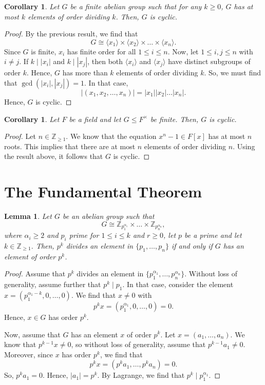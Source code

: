 \documentclass[a4paper, openany]{memoir}
\theoremstyle{definition}
\theoremstyle{plain}
\newtheorem{lemma}[definition]{Lemma}
\newtheorem{corollary}[definition]{Corollary}
\begin{document}
    \begin{corollary}
        Let $G$ be a finite abelian group such that for any $k \geq 0$, $G$ has at most $k$ elements of order dividing $k$. Then, $G$ is cyclic.
    \end{corollary}
    \begin{proof}
        By the previous result, we find that 
        \[G \cong \langle x_1 \rangle \times \langle x_2 \rangle \times \dots \times \langle x_n \rangle.\]
        Since $G$ is finite, $x_i$ has finite order for all $1 \leq i \leq n$. Now, let $1 \leq i, j \leq n$ with $i \neq j$. If $k \mid |x_i|$ and $k \mid |x_j|$, then both $\langle x_i \rangle$ and $\langle x_j \rangle$ have distinct subgroups of order $k$. Hence, $G$ has more than $k$ elements of order dividing $k$. So, we must find that $\gcd(|x_i|, |x_j|) = 1$. In that case,
        \[|(x_1, x_2, \dots, x_n)| = \lvert x_1 \rvert \lvert x_2 \rvert \dots \lvert x_n \rvert.\]
        Hence, $G$ is cyclic.
    \end{proof}

    \begin{corollary}
        Let $F$ be a field and let $G \leq F^\times$ be finite. Then, $G$ is cyclic.
    \end{corollary}
    \begin{proof}
        Let $n \in \mathbb{Z}_{\geq 1}$. We know that the equation $x^n - 1 \in F[x]$ has at most $n$ roots. This implies that there are at most $n$ elements of order dividing $n$. Using the result above, it follows that $G$ is cyclic.
    \end{proof}

    \newpage

    \section{The Fundamental Theorem}
    \begin{lemma}
        Let $G$ be an abelian group such that
        \[G \cong \mathbb{Z}_{p_1^{\alpha_1}} \times \dots \times \mathbb{Z}_{p_n^{\alpha_ n}},\]
        where $\alpha_i \geq 2$ and $p_i$ prime for $1 \leq i \leq k$ and $r \geq 0$, let $p$ be a prime and let $k \in \mathbb{Z}_{\geq 1}$. Then, $p^k$ divides an element in $\{p_1, \dots, p_n\}$ if and only if $G$ has an element of order $p^k$.
    \end{lemma}
    \begin{proof}
        Assume that $p^k$ divides an element in $\{p_1^{\alpha_1}, \dots, p_n^{\alpha_n}\}$. Without loss of generality, assume further that $p^k \mid p_1$. In that case, consider the element $x = (p_1^{\alpha_1-k}, 0, \dots, 0)$. We find that $x \neq 0$ with 
        \[p^k x = (p_1^{\alpha_1}, 0, \dots, 0) = 0.\]
        Hence, $x \in G$ has order $p^k$.

        Now, assume that $G$ has an element $x$ of order $p^k$. Let $x = (a_1, \dots, a_n)$. We know that $p^{k-1} x \neq 0$, so without loss of generality, assume that $p^{k-1} a_1 \neq 0$. Moreover, since $x$ has order $p^k$, we find that
        \[p^k x = (p^k a_1, \dots, p^k a_n) = 0.\]
        So, $p^k a_1 = 0$. Hence, $|a_1| = p^k$. By Lagrange, we find that $p^k \mid p_1^{\alpha_1}$. 
    \end{proof}
\end{document}

